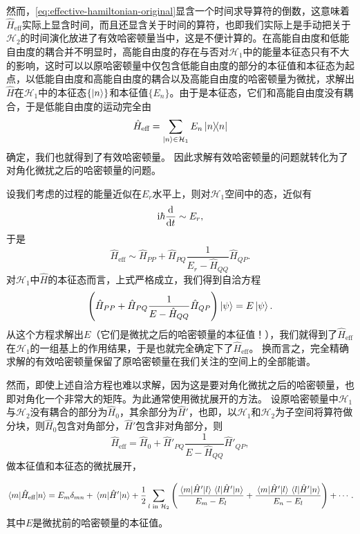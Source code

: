\documentclass[hyperref, UTF8, a4paper]{ctexart}
\newcommand*{\ii}{\mathrm{i}}
\begin{document}
然而，\eqref{eq:effective-hamiltonian-original}显含一个时间求导算符的倒数，这意味着$\hat{H}_\text{eff}$实际上显含时间，而且还显含关于时间的算符，也即我们实际上是手动把关于$\mathcal{H}_2$的时间演化放进了有效哈密顿量当中，这是不便计算的。在高能自由度和低能自由度的耦合并不明显时，高能自由度的存在与否对$\mathcal{H}_1$中的能量本征态只有不大的影响，这时可以以原哈密顿量中仅包含低能自由度的部分的本征值和本征态为起点，以低能自由度和高能自由度的耦合以及高能自由度的哈密顿量为微扰，求解出$\hat{H}$在$\mathcal{H}_1$中的本征态$\{\ket{n}\}$和本征值$\{E_n\}$。由于是本征态，它们和高能自由度没有耦合，于是低能自由度的运动完全由
\begin{equation}
    \hat{H}_\text{eff} = \sum_{\ket{n} \in \mathcal{H}_1} E_n \dyad{n}
\end{equation}
确定，我们也就得到了有效哈密顿量。
因此求解有效哈密顿量的问题就转化为了对角化微扰之后的哈密顿量的问题。

设我们考虑的过程的能量近似在$E_r$水平上，则对$\mathcal{H}_1$空间中的态，近似有
\[
    \ii \hbar \dv{t} \sim E_r,
\]
于是
\[
    \hat{H}_\text{eff} \sim \hat{H}_{PP} + \hat{H}_{PQ} \frac{1}{E_r - \hat{H}_{QQ}} \hat{H}_{QP}.
\]
对$\mathcal{H}_1$中$\hat{H}$的本征态而言，上式严格成立，我们得到自洽方程
\begin{equation}
    \left( \hat{H}_{PP} + \hat{H}_{PQ} \frac{1}{E - \hat{H}_{QQ}} \hat{H}_{QP} \right) \ket{\psi} = E \ket{\psi}.
\end{equation}
从这个方程求解出$E$（它们是微扰之后的哈密顿量的本征值！），我们就得到了$\hat{H}_\text{eff}$在$\mathcal{H}_1$的一组基上的作用结果，于是也就完全确定下了$\hat{H}_\text{eff}$。
换而言之，完全精确求解的有效哈密顿量保留了原哈密顿量在我们关注的空间上的全部能谱。

然而，即使上述自洽方程也难以求解，因为这是要对角化微扰之后的哈密顿量，也即对角化一个非常大的矩阵。为此通常使用微扰展开的方法。
设原哈密顿量中$\mathcal{H}_1$与$\mathcal{H}_2$没有耦合的部分为$\hat{H}_0$，其余部分为$\hat{H}'$，也即，以$\mathcal{H}_1$和$\mathcal{H}_2$为子空间将算符做分块，则$\hat{H}_0$包含对角部分，$\hat{H}'$包含非对角部分，则
\[
    \hat{H}_\text{eff} = \hat{H}_{0} + \hat{H}'_{PQ} \frac{1}{E - \hat{H}_{QQ}} \hat{H}'_{QP},
\]
做本征值和本征态的微扰展开，

\begin{equation}
    \mel{m}{\hat{H}_\text{eff}}{n} = E_m \delta_{mn} + \mel{m}{\hat{H}'}{n} + \frac{1}{2} \sum_{\text{$l$ in $\mathcal{H}_2$}} \left( \frac{\mel{m}{\hat{H}'}{l} \mel{l}{\hat{H}'}{n}}{E_m - E_l} + \frac{\mel{m}{\hat{H}'}{l} \mel{l}{\hat{H}'}{n}}{E_n - E_l} \right) + \cdots.
\end{equation}
其中$E$是微扰前的哈密顿量的本征值。
\end{document}
